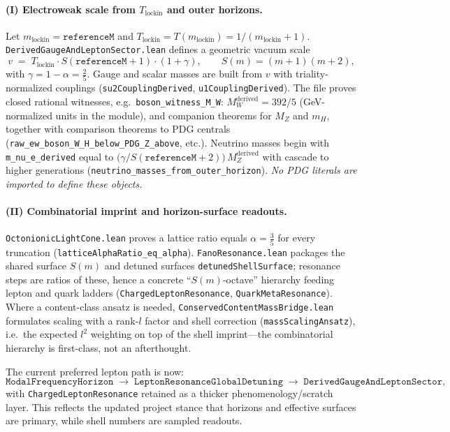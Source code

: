 \documentclass[11pt]{article}
\begin{document}
\paragraph{(I) Electroweak scale from $T_{\mathrm{lockin}}$ and outer horizons.}
Let $m_{\mathrm{lockin}}=\texttt{referenceM}$ and $T_{\mathrm{lockin}}=T(m_{\mathrm{lockin}})=1/(m_{\mathrm{lockin}}+1)$. \texttt{DerivedGaugeAndLeptonSector.lean} defines a geometric vacuum scale
\[
  v \;=\; T_{\mathrm{lockin}}\cdot S(\texttt{referenceM}+1)\cdot(1+\gamma),
  \qquad S(m)=(m+1)(m+2),
\]
with $\gamma=1-\alpha=\tfrac{2}{5}$. Gauge and scalar masses are built from $v$ with triality-normalized couplings (\texttt{su2CouplingDerived}, \texttt{u1CouplingDerived}). The file proves closed rational witnesses, e.g.\
\texttt{boson\_witness\_M\_W}: $M_W^{\mathrm{derived}}=392/5$ (GeV-normalized units in the module), and companion theorems for $M_Z$ and $m_H$, together with comparison theorems to PDG centrals (\texttt{raw\_ew\_boson\_W\_H\_below\_PDG\_Z\_above}, etc.). Neutrino masses begin with \texttt{m\_nu\_e\_derived} equal to $\bigl(\gamma/S(\texttt{referenceM}+2)\bigr)\,M_Z^{\mathrm{derived}}$ with cascade to higher generations (\texttt{neutrino\_masses\_from\_outer\_horizon}). \emph{No PDG literals are imported to define these objects.}

\paragraph{(II) Combinatorial imprint and horizon-surface readouts.}
\texttt{OctonionicLightCone.lean} proves a lattice ratio equals $\alpha=\tfrac{3}{5}$ for every truncation (\texttt{latticeAlphaRatio\_eq\_alpha}). \texttt{FanoResonance.lean} packages the shared surface $S(m)$ and detuned surfaces \texttt{detunedShellSurface}; resonance steps are ratios of these, hence a concrete ``$S(m)$-octave'' hierarchy feeding lepton and quark ladders (\texttt{ChargedLeptonResonance}, \texttt{QuarkMetaResonance}). Where a content-class ansatz is needed, \texttt{ConservedContentMassBridge.lean} formulates scaling with a rank-$l$ factor and shell correction (\texttt{massScalingAnsatz}), i.e.\ the expected $l^2$ weighting on top of the shell imprint---the combinatorial hierarchy is first-class, not an afterthought.

The current preferred lepton path is now:
\[
  \texttt{ModalFrequencyHorizon} \;\to\;
  \texttt{LeptonResonanceGlobalDetuning} \;\to\;
  \texttt{DerivedGaugeAndLeptonSector},
\]
with \texttt{ChargedLeptonResonance} retained as a thicker phenomenology/scratch layer. This reflects the
updated project stance that horizons and effective surfaces are primary, while shell numbers are sampled
readouts.
\end{document}
